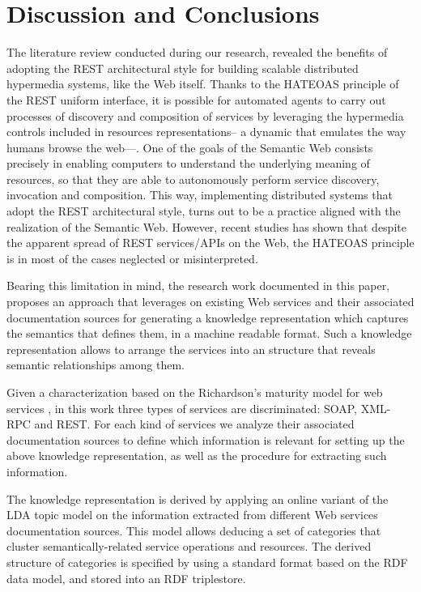 \section{Discussion and Conclusions}
\label{sec:discussion_conclusions}

\noindent The literature review conducted during our research, revealed the benefits of adopting the REST architectural style for building scalable distributed hypermedia systems, like the Web itself. Thanks to the HATEOAS principle of the REST uniform interface, it is possible for automated agents to carry out processes of discovery and composition of services by leveraging the hypermedia controls included in resources representations-- a dynamic that emulates the way humans browse the web---. One of the goals of the Semantic Web consists precisely in enabling computers to understand the underlying meaning of resources, so that they are able to autonomously perform service discovery, invocation and composition. This way, implementing distributed systems that adopt the REST architectural style, turns out to be a practice aligned with the realization of the Semantic Web. However, recent studies has shown that despite the apparent spread of REST services/APIs on the Web, the HATEOAS principle is in most 
of the cases neglected or misinterpreted.

Bearing this limitation in mind, the research work documented in this paper, proposes an approach that leverages on existing Web services and their associated documentation sources for generating a knowledge representation which captures the semantics that defines them, in a machine readable format. Such a knowledge representation allows to arrange the services into an structure that reveals semantic relationships among them.

Given a characterization based on the Richardson's maturity model for web services \cite{Richardson:2008}, in this work three types of services are discriminated: SOAP, XML-RPC and REST. For each kind of services we analyze their associated documentation sources to define which information is relevant for setting up the above knowledge representation, as well as the procedure for extracting such information.

The knowledge representation is derived by applying an online variant of the LDA topic model on the information extracted from different Web services documentation sources. This model allows deducing a set of categories that cluster semantically-related service operations and resources. The derived structure of categories is specified by using a standard format based on the RDF data model, and stored into an RDF triplestore.

